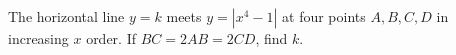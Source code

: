 The horizontal line $y=k$ meets $y=|x^4-1|$ at four points $A,B,C,D$ in increasing $x$ order. If $BC=2AB=2CD$, find $k$.
